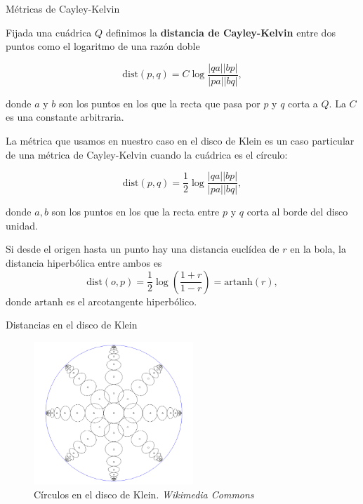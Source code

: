 \documentclass[compress]{beamer}
\begin{document}
\begin{frame}{Métricas de Cayley-Kelvin}
  \begin{definition}
    Fijada una cuádrica $Q$ definimos la \textbf{distancia de Cayley-Kelvin}
    entre dos puntos como el logaritmo de una razón doble

    \[
      \mathrm{dist}(p,q) = C\log\frac{|qa||bp|}{|pa||bq|},
    \]

    donde $a$ y $b$ son los puntos en los que la recta que pasa por $p$
    y $q$ corta a $Q$. La $C$ es una constante arbitraria.
  \end{definition}
\end{frame}
  
\begin{frame}
  La métrica que usamos en nuestro caso en el disco de Klein es
  un caso particular de una métrica de Cayley-Kelvin cuando la cuádrica
  es el círculo:

  \[
    \mathrm{dist}(p,q) = \frac{1}{2}\log\frac{|qa||bp|}{|pa||bq|},
  \]

  donde $a,b$ son los puntos en los que la recta entre $p$ y $q$ corta
  al borde del disco unidad.

  \begin{theorem}
    Si desde el origen hasta un punto hay una distancia euclídea de $r$
    en la bola, la distancia hiperbólica entre ambos es
    \[
      \mathrm{dist}(o,p) = \frac{1}{2} \log\left(\frac{1+r}{1-r}\right) = \mathrm{artanh}(r),
    \]
    donde $\mathrm{artanh}$ es el arcotangente hiperbólico.
  \end{theorem}
\end{frame}

\begin{frame}{Distancias en el disco de Klein}
  \begin{figure}[ht!]
  \centering
  \includegraphics[width=60mm]{./kleinmodelcircles.png}
  \caption{Círculos en el disco de Klein. \textit{Wikimedia Commons}\label{kleincircles}}
\end{figure}
\end{frame}
\end{document}
